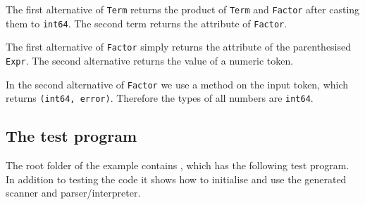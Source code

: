 \documentclass[12pt]{article}
\begin{document}
		The first alternative of \verb|Term| returns the product of \verb|Term| and \verb|Factor| after casting them to \verb|int64|. The second term returns the attribute of \verb|Factor|.

		The first alternative of \verb|Factor| simply returns the attribute of the parenthesised \verb|Expr|. The second alternative returns the value of a numeric token.

		In the second alternative of \verb|Factor| we use a method on the input token, which returns 
		\verb|(int64, error)|. Therefore the types of all numbers are \verb|int64|.

	\subsection{The test program}
		The root folder of the  example contains , which has the following test program. In addition to testing the code it shows how to initialise and use the generated scanner and parser/interpreter.
\end{document}
